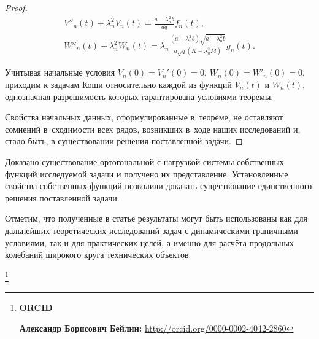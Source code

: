 \begin{proof}
\begin{gather*}

V''_n(t)+\lambda^2_nV_n(t)=\frac{a-\lambda_n^2b}{aq}f_n(t),

\\

W''_n(t)+\lambda^2_nW_n(t)=\lambda_n

\frac{(a-\lambda_n^2b)\sqrt{a-\lambda_n^2b}}{a\sqrt{q}(K-\lambda_n^2M)}g_n(t).

\end{gather*}

Учитывая начальные условия $V_n(0)=V_n'(0)=0$, $W_n(0)=W'_n(0)=0$, приходим к задачам Коши относительно каждой из функций $V_n(t)$ и $W_n(t)$, однозначная разрешимость которых гарантирована условиями теоремы. 

Свойства начальных данных, сформулированные в~теореме, не оставляют сомнений в~сходимости всех рядов, возникших в~ходе наших исследований и, стало быть, в существовании решения поставленной задачи. \end{proof}



\smallskip




Доказано существование ортогональной с нагрузкой системы собственных функций  исследуемой задачи и получено их представление. Установленные свойства  собственных функций позволили доказать существование единственного решения  поставленной задачи.

Отметим, что полученные в статье результаты могут быть использованы   как для дальнейших теоретических исследований задач с динамическими граничными  условиями, так и для практических целей, а именно для  расчёта продольных колебаний широкого круга технических объектов.





\smallskip

\thanks{{\bf ORCID}



{\bf Александр  Борисович Бейлин:} \url{http://orcid.org/0000-0002-4042-2860}



}



\RusRef



